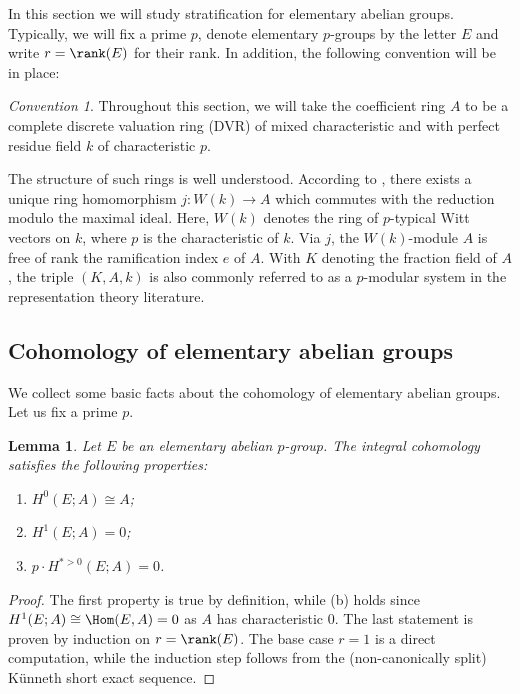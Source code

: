 \documentclass{amsart}%
\numberwithin{equation}{section}%
\newtheorem{Lem}[equation]{Lemma}
\theoremstyle{remark}
\newtheorem{Conv}[equation]{Convention}
\newcounter{enum-resume-hack}
\begin{document}
In this section we will study stratification for elementary abelian groups. Typically, we will fix a prime $p$, denote elementary $p$-groups by the letter $E$ and write $r = \rank(E)$ for their rank. In addition, the following convention will be in place:

\begin{Conv}
Throughout this section, we will take the coefficient ring $A$ to be a complete discrete valuation ring (DVR) of mixed characteristic and with perfect residue field $k$ of characteristic $p$. 
\end{Conv}

The structure of such rings is well understood. According to \cite[Thm.~II.4]{serre_localfields}, there exists a unique ring homomorphism $j\colon W(k) \to A$ which commutes with the reduction modulo the maximal ideal. Here, $W(k)$ denotes the ring of $p$-typical Witt vectors on $k$, where $p$ is the characteristic of $k$. Via $j$, the $W(k)$-module $A$ is free of rank the ramification index $e$ of $A$. With $K$ denoting the fraction field of $A$, the triple $(K,A,k)$ is also commonly referred to as a $p$-modular system in the representation theory literature. 



\subsection{Cohomology of elementary abelian groups}

We collect some basic facts about the cohomology of elementary abelian groups. Let us fix a prime $p$. %

\begin{Lem}\label{lem:elabcohom}
Let $E$ be an elementary abelian $p$-group. The integral cohomology satisfies the following properties:
    \begin{enumerate}
        \item $H^0(E;A) \cong A$;
        \item $H^1(E;A) = 0$;
        \item $p\cdot H^{*>0}(E;A) = 0$.
    \end{enumerate}
\end{Lem}
\begin{proof}
The first property is true by definition, while (b) holds since $H^1(E;A) \cong \Hom(E,A) = 0$ as $A$ has characteristic $0$. The last statement is proven by induction on $r=\rank(E)$. The base case $r=1$ is a direct computation, while the induction step follows from the (non-canonically split) K\"unneth short exact sequence. 
\end{proof}
\end{document}
